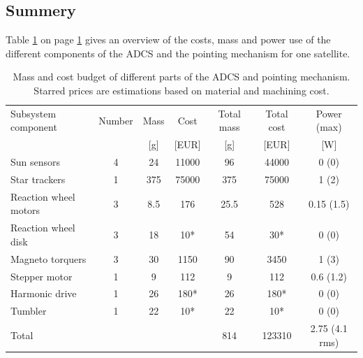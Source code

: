 \subsection{Summery}
\label{subsec:adcssum}
Table \ref{tab:adcspointbudget} on page \ref{tab:adcspointbudget} gives an overview of the costs, mass and power use of the different components of the \ac{ADCS} and the pointing mechanism for one satellite.
\begin{table}[h]
\begin{tabular}{l | c | c c | c c | c }
Subsystem component    & Number & Mass & Cost & Total mass & Total cost & Power (max)\\ 
                       &   & [g] & [EUR]& [g]  &[EUR] & [W]         \\ \hline \hline
Sun sensors            & 4 & 24  & 11000& 96   & 44000&  0 (0)      \\
Star trackers          & 1 & 375 & 75000& 375  & 75000&  1 (2)      \\ \hline
Reaction wheel motors  & 3 & 8.5 & 176  & 25.5 & 528  &  0.15 (1.5) \\
Reaction wheel disk    & 3 & 18  & 10*  & 54   & 30*  &  0 (0)      \\
Magneto torquers       & 3 & 30  & 1150 & 90   & 3450 &  1 (3)      \\ \hline
Stepper motor          & 1 & 9   & 112  & 9    & 112  &  0.6 (1.2)  \\
Harmonic drive         & 1 & 26  & 180* & 26   & 180* &  0 (0)      \\ 
Tumbler                & 1 & 22  & 10*  & 22   & 10*  &  0 (0)      \\ \hline
Total & & &                             & 814  & 123310& 2.75 (4.1 rms)
\end{tabular}
\caption[Mass and cost budget ADCS and pointing]{Mass and cost budget of different parts of the ADCS and pointing mechanism. Starred prices are estimations based on material and machining cost.}
\label{tab:adcspointbudget}
\end{table}
